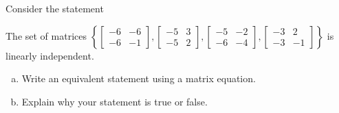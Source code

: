 
\begin{exerciseStatement}


Consider the statement 
\begin{center}\begin{minipage}{0.8\textwidth}
 The set of matrices \( \left\{ \left[\begin{array}{cc}
-6 & -6 \\
-6 & -1
\end{array}\right] , \left[\begin{array}{cc}
-5 & 3 \\
-5 & 2
\end{array}\right] , \left[\begin{array}{cc}
-5 & -2 \\
-6 & -4
\end{array}\right] , \left[\begin{array}{cc}
-3 & 2 \\
-3 & -1
\end{array}\right] \right\} \) is linearly independent.
\end{minipage}\end{center}
    


\begin{enumerate}[(a)]
\item  Write an equivalent statement using a matrix equation.
\item  Explain why your statement is true or false.
\end{enumerate}
    
\end{exerciseStatement}
    
